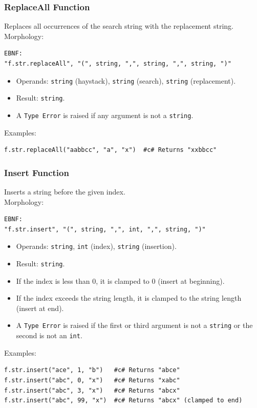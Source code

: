 \subsubsection{ReplaceAll Function}
Replaces all occurrences of the search string with the replacement string. \\
Morphology:
\begin{verbatim}
EBNF:
"f.str.replaceAll", "(", string, ",", string, ",", string, ")"
\end{verbatim}
\begin{itemize}
\item Operands: \texttt{string} (haystack), \texttt{string} (search), \texttt{string} (replacement).
\item Result: \texttt{string}.
\item A \texttt{Type Error} is raised if any argument is not a \texttt{string}.
\end{itemize}
Examples:
\begin{verbatim}
f.str.replaceAll("aabbcc", "a", "x")  #c# Returns "xxbbcc"
\end{verbatim}

\subsubsection{Insert Function}
Inserts a string before the given index. \\
Morphology:
\begin{verbatim}
EBNF:
"f.str.insert", "(", string, ",", int, ",", string, ")"
\end{verbatim}
\begin{itemize}
\item Operands: \texttt{string}, \texttt{int} (index), \texttt{string} (insertion).
\item Result: \texttt{string}.
\item If the index is less than 0, it is clamped to 0 (insert at beginning).
\item If the index exceeds the string length, it is clamped to the string length (insert at end).
\item A \texttt{Type Error} is raised if the first or third argument is not a \texttt{string} or the second is not an \texttt{int}.
\end{itemize}
Examples:
\begin{verbatim}
f.str.insert("ace", 1, "b")   #c# Returns "abce"
f.str.insert("abc", 0, "x")   #c# Returns "xabc"
f.str.insert("abc", 3, "x")   #c# Returns "abcx"
f.str.insert("abc", 99, "x")  #c# Returns "abcx" (clamped to end)
\end{verbatim}

